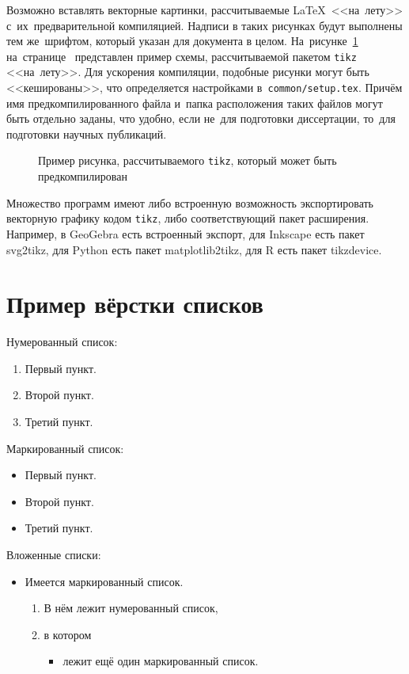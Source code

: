 Возможно вставлять векторные картинки, рассчитываемые \LaTeX\ <<на~лету>>
с~их~предварительной компиляцией. Надписи в таких рисунках будут выполнены
тем же~шрифтом, который указан для документа в целом.
На~рисунке~\ref{fig:tikz_example} на~странице~\pageref{fig:tikz_example}
представлен пример схемы, рассчитываемой пакетом \verb|tikz| <<на~лету>>.
Для ускорения компиляции, подобные рисунки могут быть <<кешированы>>, что
определяется настройками в~\verb|common/setup.tex|.
Причём имя предкомпилированного
файла и~папка расположения таких файлов могут быть отдельно заданы,
что удобно, если не~для подготовки диссертации,
то~для подготовки научных публикаций.
\begin{figure}[ht]
    \legend{}
    \caption[Пример \texttt{tikz} схемы]{Пример рисунка, рассчитываемого
        \texttt{tikz}, который может быть предкомпилирован}\label{fig:tikz_example}
\end{figure}

Множество программ имеют либо встроенную возможность экспортировать векторную
графику кодом \verb|tikz|, либо соответствующий пакет расширения.
Например, в GeoGebra есть встроенный экспорт,
для Inkscape есть пакет svg2tikz,
для Python есть пакет matplotlib2tikz,
для R есть пакет tikzdevice.

\section{Пример вёрстки списков}\label{sec:ch2/sec3}

\noindent Нумерованный список:
\begin{enumerate}
  \item Первый пункт.
  \item Второй пункт.
  \item Третий пункт.
\end{enumerate}

\noindent Маркированный список:
\begin{itemize}
  \item Первый пункт.
  \item Второй пункт.
  \item Третий пункт.
\end{itemize}

\noindent Вложенные списки:
\begin{itemize}
  \item Имеется маркированный список.
  \begin{enumerate}
    \item В нём лежит нумерованный список,
    \item в котором
    \begin{itemize}
      \item лежит ещё один маркированный список.
    \end{itemize}
  \end{enumerate}
\end{itemize}

